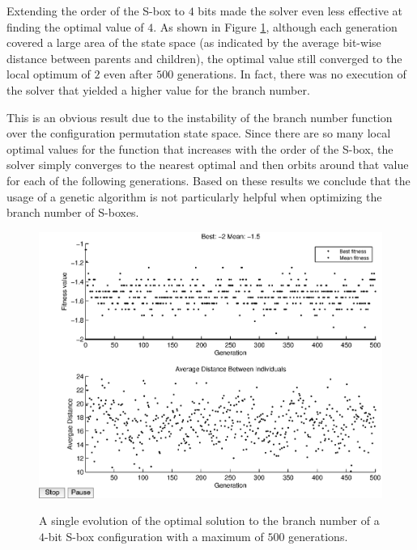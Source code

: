 \documentclass[11pt]{article}
\begin{document}
Extending the order of the S-box to $4$ bits made the solver even less effective at finding the optimal value of $4$. As shown in Figure \ref{bn16}, although each generation covered a large area of the state space (as indicated by the average bit-wise distance between parents and children), the optimal value still converged to the local optimum of $2$ even after $500$ generations. In fact, there was no execution of the solver that yielded a higher value for the branch number. 

This is an obvious result due to the instability of the branch number function over the configuration permutation state space. Since there are so many local optimal values for the function that increases with the order of the S-box, the solver simply converges to the nearest optimal and then orbits around that value for each of the following generations. Based on these results we conclude that the usage of a genetic algorithm is not particularly helpful when optimizing the branch number of S-boxes.

\begin{figure}
	\centering
	\includegraphics[scale=0.5]{images/bn_results16.eps} \\
	\label{bn16}
\caption{A single evolution of the optimal solution to the branch number of a $4$-bit S-box configuration with a maximum of $500$ generations.}
\end{figure}
\end{document}
